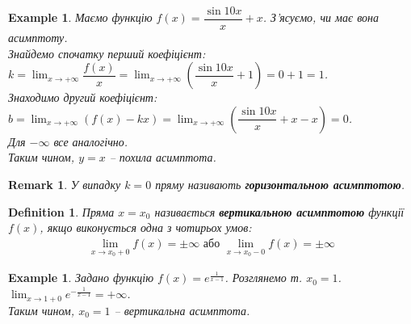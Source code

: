 \documentclass[a4paper, 14pt]{article}
\theoremstyle{theoremdd}
\theoremstyle{theoremdd}
\newtheorem{definition}[theorem]{Definition}
\theoremstyle{theoremdd}
\theoremstyle{theoremdd}
\newtheorem{example}[theorem]{Example}
\theoremstyle{theoremdd}
\theoremstyle{theoremdd}
\newtheorem{remark}[theorem]{Remark}
\theoremstyle{theoremdd}
\theoremstyle{theoremdd}
\begin{document}
\begin{example}
Маємо функцію $f(x) = \dfrac{\sin 10 x}{x} + x$. З'ясуємо, чи має вона асимптоту.\\
Знайдемо спочатку перший коефіцієнт:\\
$k = \displaystyle\lim_{x \to +\infty} \dfrac{f(x)}{x} = \lim_{x \to +\infty} \left( \dfrac{\sin 10 x}{x} + 1 \right) = 0 + 1 = 1$.\\
Знаходимо другий коефіцієнт:\\
$b = \displaystyle\lim_{x \to +\infty} (f(x) - kx) = \lim_{x \to +\infty} \left( \dfrac{\sin 10 x}{x} + x - x \right) = 0$.\\
\textit{Для $-\infty$ все аналогічно.}\\
Таким чином, $y = x$ -- похила асимптота.
\\ \iffalse %
\begin{figure}[H]
\centering
\begin{tikzpicture}[scale = 0.4]
\draw[thick,->] (-1.5,0)--(10,0) node[anchor = north west] {$x$};
\draw[thick,->] (0,-1.5)--(0,10) node[anchor = south east] {$y$};
\draw[red, variable=\x, domain=0.1:10, samples =1000] plot({\x}, {(sin(deg(10*\x)))/(\x) +\x}) node[scale = 0.7] at (3,6) {$y = \dfrac{\sin 10 x}{x} + x$};
\draw (0,0)--(10,10);
\end{tikzpicture}
\end{figure}
\fi %
\end{example}

\begin{remark}
У випадку $k = 0$ пряму називають \textbf{горизонтальною асимптотою}.
\end{remark}

\begin{definition}
Пряма $x = x_0$ називається \textbf{вертикальною асимптотою} функції $f(x)$, якщо виконується одна з чотирьох умов:
\begin{align*}
\lim_{x \to x_0 + 0} f(x) = \pm \infty \text{ або } \lim_{x \to x_0 - 0} f(x) = \pm \infty
\end{align*}
\end{definition}

\begin{example}
Задано функцію $f(x) = e^{\frac{1}{x-1}}$. Розглянемо т. $x_0 = 1$.\\
$\displaystyle \lim_{x \to 1+0} e^{-\frac{1}{x-1}} = +\infty$.\\
Таким чином, $x_0 = 1$ -- вертикальна асимптота.
\\ \iffalse %
\begin{figure}[H]
\centering
\begin{tikzpicture}[scale = 0.4]
\draw[thick,->] (-1.5,0)--(10,0) node[anchor = north west] {$x$};
\draw[thick,->] (0,-1.5)--(0,8) node[anchor = south east] {$y$};
\draw[red, variable=\x, domain=-1.5:0.9, samples =1000] plot({\x}, {exp((1)/(\x-1))});
\draw[red, variable=\x, domain=1.5:9.5, samples =1000] plot({\x}, {exp((1)/(\x-1))}) node[scale = 0.7] at (5,3) {$y = e^{\textstyle\frac{1}{x-1}}$};
\draw (1,-1.5)--(1,8);
\end{tikzpicture}
\end{figure}
\fi %
\end{example}
\end{document}
